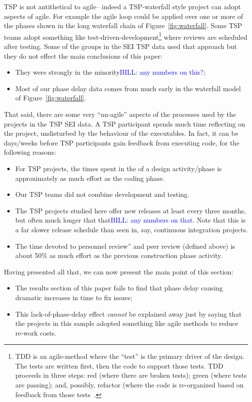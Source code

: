\documentclass{sig-alternate}
\newcommand{\bill}[1]{\textcolor{blue}{BILL: #1}}
\newcommand{\bi}{\begin{itemize}[leftmargin=0.4cm]}
\newcommand{\ei}{\end{itemize}}
\newcommand{\fig}[1]{Figure~\ref{fig:#1}}
\begin{document}
TSP is not antithetical to agile--  indeed a TSP-waterfall style project can adopt aspects
of agile.  For example the agile loop  could be applied
over one or more of the phases shown in the long waterfall chain of \fig{waterfall}. Some
TSP teams adopt something like test-driven-development\footnote{TDD is an agile-method
where the ``test'' is the primary driver of the design. The tests are written first,
then the code to support those tests. TDD proceeds in three steps: red (where there
are broken tests); green (where tests are passing); and, possibly, refactor (where
the code is re-organized based on feedback from those tests~\cite{fraser03}.} where
reviews are scheduled after testing. Some of the groups in the SEI TSP data used that approach but
they do not effect the main conclusions of this paper:
\bi 
\item They were strongly in the minority\bill{any numbers on this?};
\item Most of our phase delay data comes from much early in the waterfall model
of \fig{waterfall}.
\ei 
That said, there are some very ``un-agile'' aspects
of the processes used by the   projects in the TSP SEI data.
A TSP participant spends much time reflecting on the project,
undisturbed by the behaviour of the  executables.
In fact,
it can be days/weeks
before TSP participants gain  feedback from executing code, for the following reasons:  
\bi 
\item
For TSP projects, the times spent in the of a design activity/phase is   
approximately as much effort as the coding phase.  
\item Our TSP teams did not
 combine development and  testing. 
 \item  The TSP projects studied here offer new releases at least every three months, but
often much longer that that\bill{any numbers on that}. Note that this is a far slower
release schedule than seen in, say, continuous integration projects.  
\item The time devoted to personnel review'' and peer review (defined above)
is  about 50\% as much effort as the previous construction phase activity.
 
\ei

Having presented all that, we can now present the main point of this section:
\bi 
\item The results section of this paper fails to find that  phase delay causing dramatic increases
in time to fix issues;
\item This lack-of-phase-delay effect {\em cannot} be explained away just by  saying that
the projects in this sample adopted something like  agile methods to reduce re-work costs.
\ei  
\end{document}
